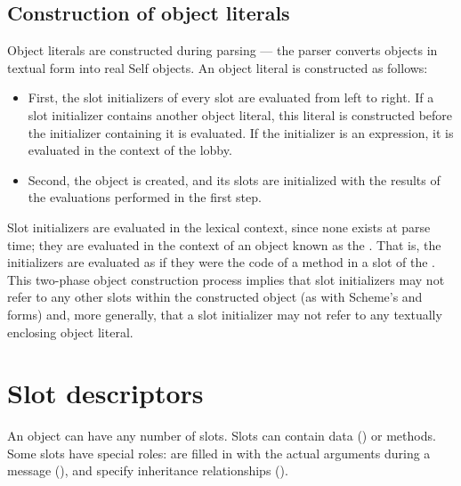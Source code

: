 \documentclass[letterpaper,10pt,english]{sphinxmanual}
\begin{document}

\subsection{Construction of object literals}
\label{\detokenize{langref:index-28}}\label{\detokenize{langref:construction-of-object-literals}}
Object literals are constructed during parsing — the parser converts objects in textual form into real Self objects.
An object literal is constructed as follows:
\begin{itemize}
\item {} 
First, the slot initializers of every slot are evaluated from left to right. If a slot initializer contains
another object literal, this literal is constructed before the initializer containing it is evaluated.
If the initializer is an expression, it is evaluated in the context of the lobby.

\item {} 
Second, the object is created, and its slots are initialized with the results of the evaluations performed
in the first step.

\end{itemize}

Slot initializers are  evaluated in the lexical context, since none exists at parse time; they are evaluated
in the context of an object known as the . That is, the initializers are evaluated as if they were the code
of a method in a slot of the . This two-phase object construction pro­cess implies that slot initializers may
not refer to any other slots within the constructed object (as with Scheme’s  and  forms) and, more generally,
that a slot initializer may not refer to any textually enclosing object literal.


\section{Slot descriptors}
\label{\detokenize{langref:slot-descriptors}}\label{\detokenize{langref:index-33}}\label{\detokenize{langref:pp-langref-slot-descriptors}}
An object can have any number of slots. Slots can contain data () or methods. Some slots have special roles:  are filled in with the actual arguments during a message ({\hyperref[\detokenize{langref:pp-mesage-send}]{}}), and  specify inheritance relationships ({\hyperref[\detokenize{langref:pp-lookup-algorithm}]{}}).
\end{document}
